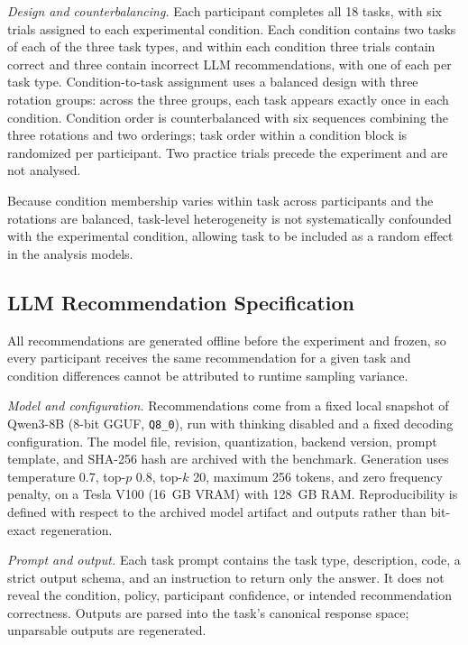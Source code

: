 \documentclass[oneside,final,14pt,a4paper]{extreport}
\begin{document}
\emph{Design and counterbalancing.} Each participant completes all 18 tasks,
with six trials assigned to each experimental condition. Each condition
contains two tasks of each of the three task types, and within each condition
three trials contain correct and three contain incorrect LLM recommendations,
with one of each per task type. Condition-to-task assignment uses a balanced
design with three rotation groups: across the three groups, each task appears
exactly once in each condition. Condition order is counterbalanced with six
sequences combining the three rotations and two orderings; task order within a
condition block is randomized per participant. Two practice trials precede the
experiment and are not analysed.

Because condition membership varies within task across participants and the
rotations are balanced, task-level heterogeneity is not systematically
confounded with the experimental condition, allowing task to be included as a
random effect in the analysis models.

\subsection{LLM Recommendation Specification}
\label{subsec:llm-spec}

All recommendations are generated offline before the experiment and frozen, so
every participant receives the same recommendation for a given task and
condition differences cannot be attributed to runtime sampling variance.

\emph{Model and configuration.} Recommendations come from a fixed local
snapshot of Qwen3-8B (8-bit GGUF, \texttt{Q8\_0}), run with thinking disabled
and a fixed decoding configuration. The model file, revision, quantization,
backend version, prompt template, and SHA-256 hash are archived with the
benchmark. Generation uses temperature 0.7, top-$p$ 0.8, top-$k$ 20, maximum
256 tokens, and zero frequency penalty, on a Tesla V100 (16~GB VRAM) with
128~GB RAM. Reproducibility is defined with respect to the archived model
artifact and outputs rather than bit-exact regeneration.

\emph{Prompt and output.} Each task prompt contains the task type, description,
code, a strict output schema, and an instruction to return only the answer. It
does not reveal the condition, policy, participant confidence, or intended
recommendation correctness. Outputs are parsed into the task's canonical
response space; unparsable outputs are regenerated.
\end{document}
